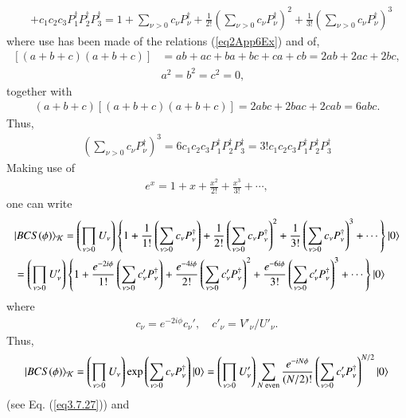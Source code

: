 \begin{subappendices}
\begin{align}
&+c_1c_2c_3P_1^\dagger P_2^\dagger P_3^\dagger=1+\sum_{\nu>0}c_\nu P_\nu^\dagger + \frac{1}{2!}\left(\sum_{\nu>0}c_\nu P^\dagger_\nu\right)^2+\frac{1}{3!}\left(\sum_{\nu>0}c_\nu P^\dagger_\nu\right)^3
\end{align}
where use has been made of the relations (\ref{eq2App6Ex}) and of,
\begin{align}
\nonumber \left[\left(a+b+c\right)\left(a+b+c\right)\right]&=ab+ac+ba +bc+ca+cb=2ab+2ac+2bc,\\
\nonumber & a^2=b^2=c^2=0,
\end{align}
together with
\begin{align}\label{eq2App9Ex}
 (a+b+c)\left[\left(a+b+c\right)\left(a+b+c\right)\right]=2abc+2bac+2cab=6abc.
\end{align}
Thus,
\begin{align}\label{eq2App10Ex}
\left(\sum_{\nu>0}c_\nu P_\nu^\dagger\right)^3=6c_1c_2c_3P_1^\dagger P_2^\dagger P_3^\dagger=3!c_1c_2c_3P_1^\dagger P_2^\dagger P_3^\dagger
\end{align}
Making use of
\begin{align}\label{eq2App11Ex}
e^x=1+x+\frac{x^2}{2!}+\frac{x^3}{3!}+\cdots,
\end{align}
one can write
\begin{align}\label{eq1App11Ex} 
\nonumber &|{BCS(\phi)} \rangle_{\mathcal K}=\left(\prod_{\nu>0}U_\nu\right)\left\{1+\frac{1}{1!}\left(\sum_{\nu>0}c_\nu P_\nu^\dagger\right)+\frac{1}{2!}\left(\sum_{\nu>0}c_\nu P_\nu^\dagger\right)^2+\frac{1}{3!}\left(\sum_{\nu>0}c_\nu P_\nu^\dagger\right)^3+\cdots\right\}|{0} \rangle\\
&=\left(\prod_{\nu>0}U'_\nu\right)\left\{1+\frac{e^{-2i\phi}}{1!}\left(\sum_{\nu>0}c'_\nu P_\nu^\dagger\right)+\frac{e^{-4i\phi}}{2!}\left(\sum_{\nu>0}c'_\nu P_\nu^\dagger\right)^2+\frac{e^{-6i\phi}}{3!}\left(\sum_{\nu>0}c'_\nu P_\nu^\dagger\right)^3+\cdots\right\}|{0} \rangle
\end{align}
where
\begin{align}\label{eq2App12Ex}
 c_\nu=e^{-2i\phi}c_\nu',\quad c'_\nu=V'_\nu/U'_\nu.
\end{align}
Thus,
\begin{align}\label{eq2App13Ex}
|{BCS(\phi)} \rangle_{\mathcal K}=\left(\prod_{\nu>0}U_\nu\right)\exp\left(\sum_{\nu>0}c_\nu P_\nu^\dagger\right)|{0} \rangle=\left(\prod_{\nu>0}U'_\nu\right)\sum_{N \text{ even}}\frac{e^{-iN\phi}}{(N/2)!}\left(\sum_{\nu>0}c'_\nu P_\nu^\dagger\right)^{N/2}|{0} \rangle
\end{align}
(see Eq. (\ref{eq3.7.27})) and
\begin{align}\label{eq2App14Ex}

\end{align}
\end{subappendices}

